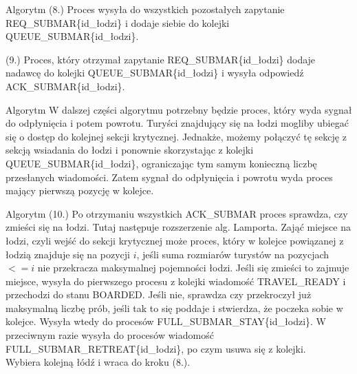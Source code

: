 \documentclass{beamer}
\begin{document}
\begin{frame}{Algorytm}
    \internallinenumbers
    (8.) Proces wysyła do wszystkich pozostałych zapytanie REQ\_SUBMAR\{id\_łodzi\} i dodaje siebie do kolejki QUEUE\_SUBMAR\{id\_łodzi\}.

    \vspace{0.5cm}
    (9.) Proces, który otrzymał zapytanie REQ\_SUBMAR\{id\_łodzi\} dodaje nadawcę do kolejki QUEUE\_SUBMAR\{id\_łodzi\} i wysyła odpowiedź ACK\_SUBMAR\{id\_łodzi\}.

\end{frame}

\begin{frame}{Algorytm}
    \internallinenumbers
    W dalszej części algorytmu potrzebny będzie proces, który wyda sygnał do odpłynięcia i potem powrotu. Turyści znajdujący się na łodzi mogliby ubiegać się o dostęp do kolejnej sekcji krytycznej. Jednakże, możemy połączyć tę sekcję z sekcją wsiadania do łodzi i ponownie skorzystając z kolejki QUEUE\_SUBMAR\{id\_łodzi\}, ograniczając tym samym konieczną liczbę przesłanych wiadomości. Zatem sygnał do odpłynięcia i powrotu wyda proces mający pierwszą pozycję w kolejce.
\end{frame}

\begin{frame}{Algorytm}
    \internallinenumbers
    (10.) Po otrzymaniu wszystkich ACK\_SUBMAR proces sprawdza, czy zmieści się na łodzi. Tutaj następuje rozszerzenie alg. Lamporta. Zająć miejsce na łodzi, czyli wejść do sekcji krytycznej może proces, który w kolejce powiązanej z łodzią znajduje się na pozycji $i$, jeśli suma rozmiarów turystów na pozycjach $<= i$ nie przekracza maksymalnej pojemności łodzi. Jeśli się zmieści to zajmuje miejsce, wysyła do pierwszego procesu z kolejki wiadomość TRAVEL\_READY i przechodzi do stanu BOARDED. Jeśli nie, sprawdza czy przekroczył już maksymalną liczbę prób, jeśli tak to się poddaje i stwierdza, że poczeka sobie w kolejce. Wysyła wtedy do procesów FULL\_SUBMAR\_STAY\{id\_łodzi\}. W przeciwnym razie wysyła do procesów wiadomość FULL\_SUBMAR\_RETREAT\{id\_łodzi\}, po czym usuwa się z kolejki. \\
    Wybiera kolejną łódź i wraca do kroku (8.).
\end{frame}
\end{document}
